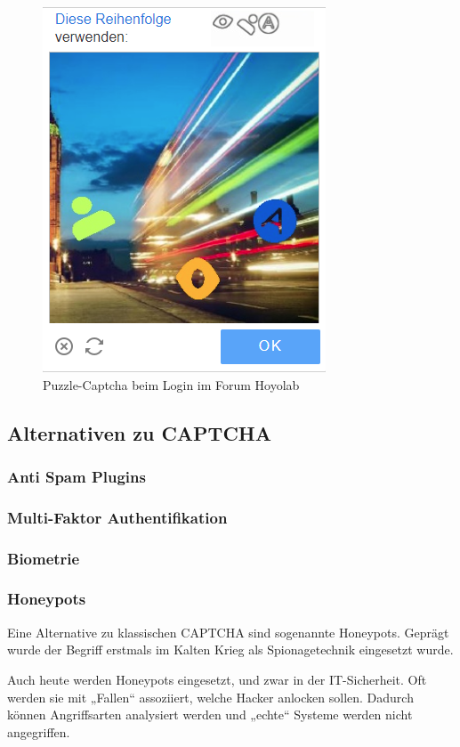 \begin{figure}
    \centering
    \includegraphics{gfx/mygraphics/hoyoversecaptcha.png}
    \caption{Puzzle-Captcha beim Login im Forum Hoyolab}
    \label{fig:hoyolabcaptcha}
\end{figure}

\subsection{Alternativen zu CAPTCHA}
\subsubsection{Anti Spam Plugins}
\subsubsection{Multi-Faktor Authentifikation}
\subsubsection{Biometrie}
\subsubsection{Honeypots}

Eine Alternative zu klassischen CAPTCHA sind sogenannte Honeypots. 
Geprägt wurde der Begriff erstmals im Kalten Krieg als Spionagetechnik eingesetzt wurde. \cite[p.2]{joshi:2011} 

Auch heute werden Honeypots eingesetzt, und zwar in der IT-Sicherheit. 
Oft werden sie mit „Fallen“ assoziiert, welche Hacker anlocken sollen. 
Dadurch können Angriffsarten analysiert werden und „echte“ Systeme werden nicht angegriffen.

